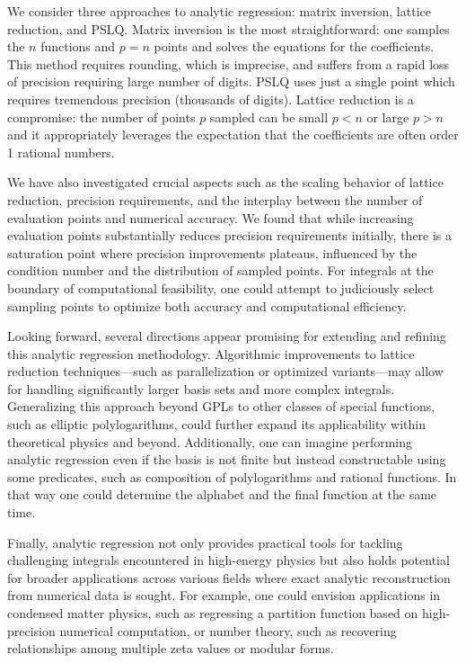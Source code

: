 \documentclass[a4paper,11pt]{article}
\begin{document}
We consider three approaches to analytic regression: matrix inversion, lattice reduction, and PSLQ. Matrix inversion is the most straightforward: one samples the $n$ functions and $p=n$ points and solves the equations for the coefficients. This method requires rounding, which is imprecise, and suffers from a rapid loss of precision requiring large number of digits. PSLQ uses just a single point which requires tremendous precision (thousands of digits). Lattice reduction is a compromise: the number of points $p$ sampled can be small $p<n$ or large $p>n$ and it appropriately leverages the expectation that the coefficients are often order 1 rational numbers. 

We have also investigated crucial aspects such as the scaling behavior of lattice reduction, precision requirements, and the interplay between the number of evaluation points and numerical accuracy. We found that while increasing evaluation points substantially reduces precision requirements initially, there is a saturation point where precision improvements plateaus, influenced by the condition number and the distribution of sampled points. For integrals at the boundary of computational feasibility, one could attempt to judiciously select sampling points to optimize both accuracy and computational efficiency.

Looking forward, several directions appear promising for extending and refining this analytic regression methodology. Algorithmic improvements to lattice reduction techniques—such as parallelization or optimized variants—may allow for handling significantly larger basis sets and more complex integrals. Generalizing this approach beyond GPLs to other classes of special functions, such as elliptic polylogarithms, could further expand its applicability within theoretical physics and beyond. Additionally, one can imagine performing analytic regression even if the basis is not finite but instead constructable using some predicates, such as composition of polylogarithms and rational functions. In that way one could determine the alphabet and the final function at the same time. 

Finally, analytic regression not only provides practical tools for tackling challenging integrals encountered in high-energy physics but also holds potential for broader applications across various fields where exact analytic reconstruction from numerical data is sought. For example, one could envision applications in condensed matter physics, such as regressing a partition function based on high-precision numerical computation, or number theory, such as recovering relationships among multiple zeta values or modular forms.
\end{document}

